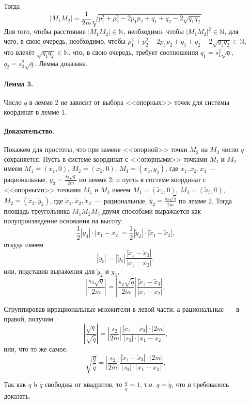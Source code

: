 \documentclass[a4paper,14pt]{article} %
\begin{document}
Тогда
\begin{equation}
	|M_1 M_2| = \frac{1}{2m} \sqrt{p_1^2 + p_2^2 - 2p_1p_2 + q_1 + q_2 - 2\sqrt{q_1 q_2}}
\end{equation}
Для того, чтобы расстояние $|M_1 M_2| \in \mathbb{N}$, необходимо,
чтобы $|M_1 M_2|^2 \in \mathbb{N}$, для чего, в свою очередь, необходимо, чтобы
$p_1^2 + p_2^2 - 2p_1p_2 + q_1 + q_2 - 2\sqrt{q_1 q_2} \in \mathbb{N}$,
что влечёт $\sqrt{q_1 q_2} \in \mathbb{N}$,
что, в свою очередь, требует соотношения
$q_1 = s_1^2 \sqrt{q}$, $q_2 = s_2^2 \sqrt{q}$.
Лемма доказана.

\paragraph{Лемма 3.}
Число $q$ в лемме 2 не зависит от выбора <<опорных>> точек для системы координат в лемме 1.

\paragraph{Доказательство.}
Покажем для простоты, что при замене <<опорной>> точки $M_2$ на $M_3$ число $q$ сохраняется.
Пусть в системе координат с <<опорными>> точками $M_1$ и $M_2$ имеем
$M_1=(x_1, 0)$, $M_2=(x_2, 0)$, $M_3=(x_3, y_3)$,
где $x_1, x_2, x_3$~--- рациональные, $y_3 = \frac{s_3\sqrt{q}}{2m}$ по лемме 2;
и пусть в системе координат с <<опорными>> точками $M_1$ и $M_3$ имеем
$M_1=(\tilde{x}_1, 0)$, $M_3=(\tilde{x}_3, 0)$, $M_2=(\tilde{x}_2, \tilde{y}_2)$,
где $\tilde{x}_1, \tilde{x}_2, \tilde{x}_3$~--- рациональные, $\tilde{y}_2 = \frac{s_2\sqrt{\tilde{q}}}{2\tilde{m}}$ по лемме 2.
Тогда площадь треугольника $M_1 M_2 M_3$ двумя способами выражается как полупроизведение основания на высоту:
\begin{equation}
	\frac{1}{2} |y_3| \cdot |x_1 - x_2|
	=
	\frac{1}{2} |\tilde{y}_2| \cdot |\tilde{x}_1 - \tilde{x}_3|,
\end{equation}
откуда имеем
\begin{equation}
	|y_3|
	=
	|\tilde{y}_2| \frac{ |\tilde{x}_1 - \tilde{x}_3|}{|x_1 - x_2|},
\end{equation}
или, подставив выражения для $\tilde{y}_2$ и $y_3$,
\begin{equation}
	\left|\frac{s_3\sqrt{q}}{2m}\right|
	=
	\left|\frac{s_2\sqrt{\tilde{q}}}{2\tilde{m}}\right| \frac{ |\tilde{x}_1 - \tilde{x}_3|}{|x_1 - x_2|},
\end{equation}

Сгруппировав иррациональные множители в левой части, а рациональные~--- в правой, получим
\begin{equation}
	\left|\frac{\sqrt{q}}{\sqrt{\tilde{q}}}\right|
	=
	\left|\frac{s_2}{2\tilde{m}}\right| \frac{ |\tilde{x}_1 - \tilde{x}_3|\cdot|2m|}{|s_3|\cdot|x_1 - x_2|},
\end{equation}
или, что то же самое,
\begin{equation}
	\sqrt{\frac{q}{\tilde{q}}}
	=
	\left|\frac{s_2}{2\tilde{m}}\right| \frac{ |\tilde{x}_1 - \tilde{x}_3|\cdot|2m|}{|s_3|\cdot|x_1 - x_2|},
\end{equation}

Так как $q$ b $\tilde{q}$ свободны от квадратов, то $\frac{q}{\tilde{q}} = 1$, т.е. $q = \tilde{q}$,
что и требовалось доказать.


\printbibliography
\end{document}
